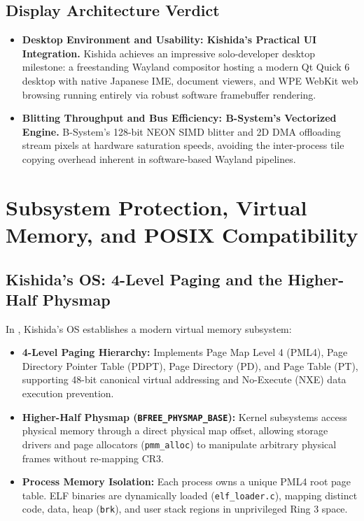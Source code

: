 \documentclass[10pt,journal,compsoc,twocolumn]{article}
\begin{document}
\subsection{Display Architecture Verdict}
\begin{itemize}[leftmargin=*]
    \item \textbf{Desktop Environment and Usability: Kishida's Practical UI Integration.} Kishida achieves an impressive solo-developer desktop milestone: a freestanding Wayland compositor hosting a modern Qt Quick 6 desktop with native Japanese IME, document viewers, and WPE WebKit web browsing running entirely via robust software framebuffer rendering.
    \item \textbf{Blitting Throughput and Bus Efficiency: B-System's Vectorized Engine.} B-System's 128-bit NEON SIMD blitter and 2D DMA offloading stream pixels at hardware saturation speeds, avoiding the inter-process tile copying overhead inherent in software-based Wayland pipelines.
\end{itemize}

\section{Subsystem Protection, Virtual Memory, and POSIX Compatibility}
\label{sec:mmu}

\subsection{Kishida's OS: 4-Level Paging and the Higher-Half Physmap}
In , Kishida's OS establishes a modern virtual memory subsystem:
\begin{itemize}[leftmargin=*]
    \item \textbf{4-Level Paging Hierarchy:} Implements Page Map Level 4 (PML4), Page Directory Pointer Table (PDPT), Page Directory (PD), and Page Table (PT), supporting 48-bit canonical virtual addressing and No-Execute (NXE) data execution prevention.
    \item \textbf{Higher-Half Physmap (\texttt{BFREE\_PHYSMAP\_BASE}):} Kernel subsystems access physical memory through a direct physical map offset, allowing storage drivers and page allocators (\texttt{pmm\_alloc}) to manipulate arbitrary physical frames without re-mapping CR3.
    \item \textbf{Process Memory Isolation:} Each process owns a unique PML4 root page table. ELF binaries are dynamically loaded (\texttt{elf\_loader.c}), mapping distinct code, data, heap (\texttt{brk}), and user stack regions in unprivileged Ring 3 space.
\end{itemize}
\end{document}
